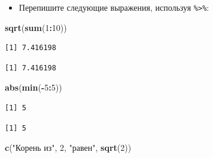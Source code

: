\documentclass[
]{book}
\newenvironment{Shaded}{\begin{snugshade}}{\end{snugshade}}
\newcommand{\DecValTok}[1]{\textcolor[rgb]{0.00,0.00,0.81}{#1}}
\newcommand{\KeywordTok}[1]{\textcolor[rgb]{0.13,0.29,0.53}{\textbf{#1}}}
\newcommand{\NormalTok}[1]{#1}
\newcommand{\OperatorTok}[1]{\textcolor[rgb]{0.81,0.36,0.00}{\textbf{#1}}}
\newcommand{\StringTok}[1]{\textcolor[rgb]{0.31,0.60,0.02}{#1}}
\providecommand{\tightlist}{%
  \setlength{\itemsep}{0pt}\setlength{\parskip}{0pt}}
\begin{document}
\begin{itemize}
\tightlist
\item
  Перепишите следующие выражения, используя \texttt{\%\textgreater{}\%}:
\end{itemize}

\begin{Shaded}
\begin{Highlighting}[]
\KeywordTok{sqrt}\NormalTok{(}\KeywordTok{sum}\NormalTok{(}\DecValTok{1}\OperatorTok{:}\DecValTok{10}\NormalTok{))}
\end{Highlighting}
\end{Shaded}

\begin{verbatim}
[1] 7.416198
\end{verbatim}

\begin{Shaded}
\end{Shaded}

\begin{verbatim}
[1] 7.416198
\end{verbatim}

\begin{Shaded}
\begin{Highlighting}[]
\KeywordTok{abs}\NormalTok{(}\KeywordTok{min}\NormalTok{(}\OperatorTok{-}\DecValTok{5}\OperatorTok{:}\DecValTok{5}\NormalTok{))}
\end{Highlighting}
\end{Shaded}

\begin{verbatim}
[1] 5
\end{verbatim}

\begin{Shaded}
\end{Shaded}

\begin{verbatim}
[1] 5
\end{verbatim}

\begin{Shaded}
\begin{Highlighting}[]
\KeywordTok{c}\NormalTok{(}\StringTok{"Корень из"}\NormalTok{, }\DecValTok{2}\NormalTok{, }\StringTok{"равен"}\NormalTok{, }\KeywordTok{sqrt}\NormalTok{(}\DecValTok{2}\NormalTok{))}
\end{Highlighting}
\end{Shaded}
\end{document}
